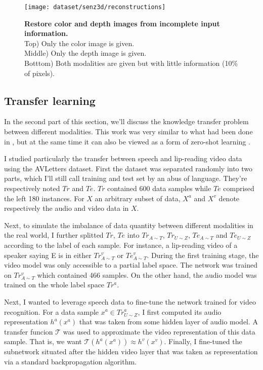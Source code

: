 \begin{figure}[H]
  \centering
  \texttt{[image: dataset/senz3d/reconstructions]}\\[-1em]
  \caption{%
    \textbf{Restore color and depth images from incomplete input
      information.}\\[0.1em]
    Top) Only the color image is given.\\[0.1em]
    Middle) Only the depth image is given.\\[0.1em]
    Botttom) Both modalities are given but with little information
      (10\% of pixels).}
  \label{fig:color_depth_restoration}
\end{figure}

\subsection{Transfer learning} \label{subsection:AVSR_transfer}

In the second part of this section, we'll discuss the knowledge transfer
problem between different modalities. This work was very similar to what
had been done in \cite{S. Moon 2015}, but at the same time it can also be
viewed as a form of zero-shot learning \cite{A. Frome 2013, R. Socher 2013}.

I studied particularly the transfer between speech and lip-reading
video data using the AVLetters dataset. First the dataset was separated
randomly into two parts, which I'll still call training and test set
by an abus of language. They're respectively noted $Tr$ and $Te$.
$Tr$ contained 600 data samples while $Te$ comprised the left 180 instances.
For $X$ an arbitrary subset of data, $X^a$ and $X^v$ denote respectively
the audio and video data in $X$.

Next, to simulate the imbalance of data quantity between different
modalities in the real world, I further splitted $Tr$, $Te$ into
$Tr_{A\sim T}$, $Tr_{U\sim Z}$, $Te_{A\sim T}$ and $Te_{U\sim Z}$
according to the label of each sample.
For instance, a lip-reading video of a speaker saying E is in either
$Tr_{A\sim T}^v$ or $Te_{A\sim T}^v$.
During the first training stage, the video model was only accessible
to a partial label space. The network was trained on $Tr_{A\sim T}^v$
which contained 466 samples. On the other hand, the audio model was trained
on the whole label space $Tr^a$.

Next, I wanted to leverage speech data to fine-tune the network trained for
video recognition. For a data sample $x^a\in Tr_{U\sim Z}^a$, I first
computed its audio representation $h^a(x^a)$ that was taken from some
hidden layer of audio model. A transfer funcion $\mathcal{T}$ was used
to approximate the video representation of this data sample.
That is, we want $\mathcal{T}(h^a(x^a))\approx h^v(x^v)$. Finally, I
fine-tuned the subnetwork situated after the hidden video layer that
was taken as representation via a standard backpropagation algorithm.

